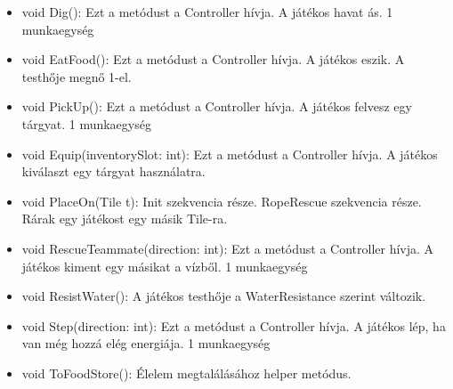 \begin{itemize}
\begin{itemize}
		\item void Dig(): Ezt a metódust a Controller hívja. A játékos havat ás. 1 munkaegység
		\item void EatFood(): Ezt a metódust a Controller hívja. A játékos eszik. A testhője megnő 1-el.
		\item void PickUp(): Ezt a metódust a Controller hívja. A játékos felvesz egy tárgyat. 1 munkaegység
		\item void Equip(inventorySlot: int): Ezt a metódust a Controller hívja. A játékos kiválaszt egy tárgyat használatra.
		\item void PlaceOn(Tile t): Init szekvencia része. RopeRescue szekvencia része. Rárak egy játékost egy másik Tile-ra.
		\item void RescueTeammate(direction: int): Ezt a metódust a Controller hívja. A játékos kiment egy másikat a vízből. 1 munkaegység
		\item void ResistWater(): A játékos testhője a WaterResistance szerint változik.
		\item void Step(direction: int): Ezt a metódust a Controller hívja. A játékos lép, ha van még hozzá elég energiája. 1 munkaegység
		\item void ToFoodStore(): Élelem megtalálásához helper metódus.
	\end{itemize}
\end{itemize}

